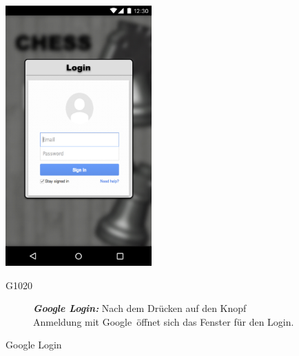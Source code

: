 \documentclass[parskip=full]{scrartcl}
\begin{document}
\begin{figure}[htp]
		\begin{minipage}[t]{6cm}
			\vspace{0pt}
			\includegraphics[height=100mm]{google_login.png}
			\caption{Google Login}
			\label{fig:Google Login}
		\end{minipage}
		\hfill
		\begin{minipage}[t]{6cm}
			\vspace{0pt}
			\begin{description}
				\item[G1020] \textbf{\textit{Google Login: }} Nach dem Drücken auf den Knopf \glqq Anmeldung mit Google\grqq\ öffnet sich das Fenster für den Login.
			\end{description}
		\end{minipage}
	\end{figure}
	
\end{document}

